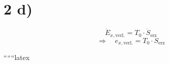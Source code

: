 \section*{2 d)}
\begin{equation*}
\dot{E}_{x,\text{verl.}} = T_0 \cdot \dot{S}_{\text{erz}}
\end{equation*}
\begin{equation*}
\Rightarrow \quad e_{x,\text{verl.}} = T_0 \cdot S_{\text{erz}}
\end{equation*}

``````latex